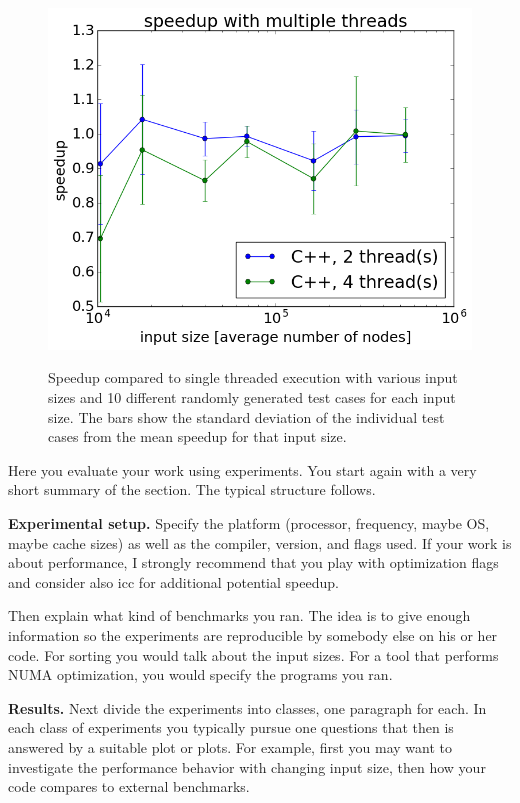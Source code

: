 \documentclass[letterpaper]{article}
\newcommand{\mypar}[1]{{\bf #1.}}
\begin{document}
\begin{figure}
	\includegraphics[width=\linewidth]{speedupPlot_with_java}
	\label{fig:cpp_speedup}
	\caption{Speedup compared to single threaded execution with various input sizes and 10 different randomly generated test cases for each input size. The bars show the standard deviation of the individual test cases from the mean speedup for that input size.}
\end{figure}

Here you evaluate your work using experiments. You start again with a
very short summary of the section. The typical structure follows.

\mypar{Experimental setup} Specify the platform (processor, frequency, maybe OS, maybe cache sizes)
as well as the compiler, version, and flags used. If your work is about performance, 
I strongly recommend that you play with optimization flags and consider also icc for additional potential speedup.

Then explain what kind of benchmarks you ran. The idea is to give enough information so the experiments are reproducible by somebody else on his or her code.
For sorting you would talk about the input sizes. For a tool that performs NUMA optimization, you would specify the programs you ran.

\mypar{Results}
Next divide the experiments into classes, one paragraph for each. In each class of experiments you typically pursue one questions that then is answered by a suitable plot or plots. For example, first you may want to investigate the performance behavior with changing input size, then how your code compares to external benchmarks.
\end{document}

